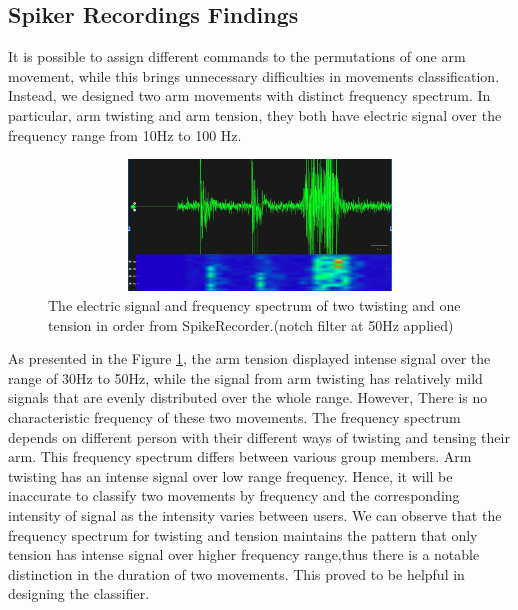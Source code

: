 \documentclass[oneside]{article}
\begin{document}
\subsection{Spiker Recordings Findings}
\label{spikefind}
It is possible to assign different commands to the permutations of one arm movement, while this brings unnecessary difficulties in movements classification. Instead, we designed two arm movements with distinct frequency spectrum. In particular, arm twisting and arm tension, they both have electric signal over the frequency range from 10Hz to 100 Hz. 
\begin{figure}[H]
  \centering
  \includegraphics[width = 17cm, height = 3.5cm]{Pictures/UUE_1.png}
  \caption{The electric signal and frequency spectrum of two twisting and one tension in order from SpikeRecorder.(notch filter at 50Hz applied)}
  \label{UUE1}
  \end{figure}
As presented in the Figure \ref{UUE1}, the arm tension displayed intense signal over the range of 30Hz to 50Hz, while the signal from arm twisting has relatively mild signals that are evenly distributed over the whole range.
\newline
\newline
However, There is no characteristic frequency of these two movements. The frequency spectrum depends on different person with their different ways of twisting and tensing their arm. This frequency spectrum differs between various group members.
 Arm twisting has an intense signal over low range frequency. Hence, it will be inaccurate to classify two movements by frequency and the corresponding intensity of signal as the intensity varies between users. We can observe that the frequency spectrum for twisting and tension maintains the pattern that only tension has intense signal over higher frequency range,thus there is a notable distinction in the duration of two movements. This proved to be helpful in designing the classifier.
\end{document}
